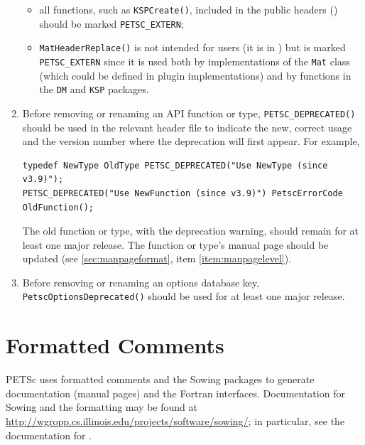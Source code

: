 \begin{enumerate}
\begin{itemize}
\item all functions, such as \lstinline{KSPCreate()}, included in the public headers () should be marked \lstinline{PETSC_EXTERN};
\item \lstinline{MatHeaderReplace()} is not intended for users (it is in ) but is marked \lstinline{PETSC_EXTERN} since it is used both by implementations of the \lstinline{Mat} class (which could be defined in plugin implementations) and by functions in the \lstinline{DM} and \lstinline{KSP} packages.
\end{itemize}
\item Before removing or renaming an API function or type, \lstinline{PETSC_DEPRECATED()} should be used in the relevant header file to indicate the new, correct usage and the version number where the deprecation will first appear. For example,
\begin{lstlisting}
typedef NewType OldType PETSC_DEPRECATED("Use NewType (since v3.9)");
PETSC_DEPRECATED("Use NewFunction (since v3.9)") PetscErrorCode OldFunction();
\end{lstlisting}
The old function or type, with the deprecation warning, should remain for at least one major release. The function or type's manual page should be updated (see \ref{sec:manpageformat}, item \ref{item:manpagelevel}).
\item Before removing or renaming an options database key, \lstinline{PetscOptionsDeprecated()} should be used for at least one major release.
\end{enumerate}

\section{Formatted Comments}

PETSc uses formatted comments and the Sowing packages \cite{gropp1993sowing,gropp1993sowing2} to generate documentation (manual pages) and the Fortran interfaces.
Documentation for Sowing and the formatting may be found at \href{http://wgropp.cs.illinois.edu/projects/software/sowing/}{http://wgropp.cs.illinois.edu/projects/software/sowing/}; in particular, see the documentation for .

